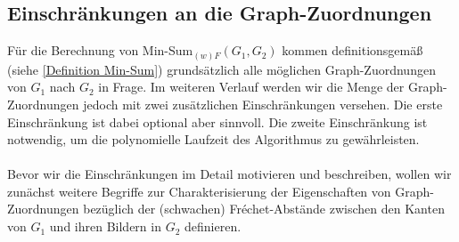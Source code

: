 \documentclass[a4paper, 12pt, twoside]{article}
\theoremstyle{Format1} %
\begin{document}
\subsection{Einschränkungen an die Graph-Zuordnungen} \label{Einschränkungen}
Für die Berechnung von Min-Sum$_{(w)F}(G_1, G_2)$ kommen definitionsgemäß (siehe \ref{Definition Min-Sum}) grundsätzlich alle möglichen
Graph-Zuordnungen von $G_1$ nach $G_2$ in Frage.
Im weiteren Verlauf werden wir die Menge der Graph-Zuordnungen jedoch mit zwei zusätzlichen Einschränkungen versehen.
Die erste Einschränkung ist dabei optional aber sinnvoll. Die zweite Einschränkung ist notwendig, um die polynomielle Laufzeit des Algorithmus zu gewährleisten.
\\
\\
Bevor wir die Einschränkungen im Detail motivieren und beschreiben, wollen wir zunächst weitere Begriffe zur Charakterisierung der Eigenschaften von Graph-Zuordnungen bezüglich
der (schwachen) Fréchet-Abstände zwischen den Kanten von $G_1$ und ihren Bildern in $G_2$ definieren.
\end{document}
